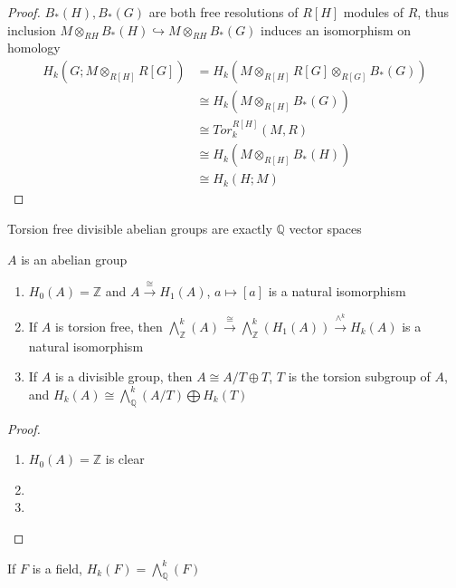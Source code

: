 \documentclass[../main.tex]{subfiles}
\begin{document}
\begin{proof}
$B_*(H), B_*(G)$ are both free resolutions of $R[H]$ modules of $R$, thus inclusion $M\otimes_{RH}B_*(H)\hookrightarrow M\otimes_{RH}B_*(G)$ induces an isomorphism on homology
\begin{align*}
H_k(G;M\otimes_{R[H]}R[G])&=H_k(M\otimes_{R[H]}R[G]\otimes _{R[G]}B_*(G)) \\
&\cong H_k(M\otimes_{R[H]}B_*(G)) \\
&\cong Tor^{R[H]}_k(M,R) \\
&\cong H_k(M\otimes_{R[H]}B_*(H)) \\
&\cong H_k(H;M)
\end{align*}
\end{proof}

\begin{lemma}
Torsion free divisible abelian groups are exactly $\mathbb Q$ vector spaces
\end{lemma}

\begin{proposition}\label{Homology of abelian groups}
$A$ is an abelian group
\begin{enumerate}[label=\textbf{\arabic*.}, leftmargin=*]
\item $H_0(A)=\mathbb Z$ and $A\xrightarrow\cong H_1(A)$, $a\mapsto [a]$ is a natural isomorphism
\item If $A$ is torsion free, then $\bigwedge^k_{\mathbb Z}(A)\xrightarrow \cong\bigwedge^k_{\mathbb Z}(H_1(A))\xrightarrow{\wedge^k}H_k(A)$ is a natural isomorphism
\item If $A$ is a divisible group, then $A\cong A/T\oplus T$, $T$ is the torsion subgroup of $A$, and $H_k(A)\cong\bigwedge^k_{\mathbb Q}(A/T)\bigoplus H_k(T)$
\end{enumerate}
\end{proposition}

\begin{proof} \hfill
\begin{enumerate}[label=\textbf{\arabic*.}, leftmargin=*]
\item $H_0(A)=\mathbb Z$ is clear
\item
\item
\end{enumerate}
\end{proof}

\begin{example}
If $F$ is a field, $H_k(F)=\bigwedge^k_{\mathbb Q}(F)$
\end{example}
\end{document}

